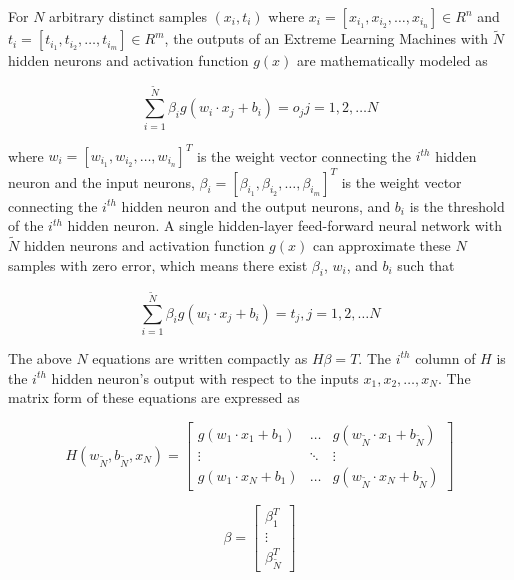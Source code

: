 \documentclass{ncjms}
\begin{document}
	For $N$ arbitrary distinct samples $(x_i, t_i) $ where $x_i = \left[ x_{i_{1}}, x_{i_{2}}, \dots, x_{i_{n}} \right] \in R^n$ and $t_i = \left[ t_{i_{1}}, t_{i_{2}}, \dots, t_{i_{m}} \right] \in R^m$, the outputs of an Extreme Learning Machines with $\tilde{N}$ hidden neurons and activation function $g(x)$ are mathematically modeled as

	\begin{equation}
		\sum_{i=1}^{\tilde{N}} \beta_i g (w_i \cdot x_j + b_i)=o_j         j=1,2, \dots N
	\end{equation}

	where $w_i = \left[ w_{i_{1}}, w_{i_{2}}, \dots, w_{i_{n}} \right]^T$ is the weight vector connecting the $i^{th}$ hidden neuron and the input neurons, $\beta_i=\left[ \beta_{i_{1}}, \beta_{i_{2}}, \dots, \beta_{i_{m}}\right]^T$ is the weight vector connecting the $i^{th}$ hidden neuron and the output neurons, and $b_i$ is the threshold of the $i^{th}$ hidden neuron.
	A single hidden-layer feed-forward neural network with $\tilde{N}$ hidden neurons and activation function $g(x)$ can approximate these $N$ samples with zero error, which means there exist $\beta_i$, $w_i$, and $b_i$ such that

	\begin{equation}
		\sum_{ i = 1}^{\tilde{N}} \beta_i g (w_i \cdot x_j + b_i) = t_j, 	j=1,2, \dots N
	\end{equation}

	The above $N$ equations are written compactly as $H \beta = T$.
	The $i^{th}$ column of $H$ is the $i^{th}$ hidden neuron’s output with respect to the inputs $x_1, x_2, \dots, x_N$.
	The matrix form of these equations are expressed as

	\begin{equation}
		H(w_{\tilde{N}}, b_{\tilde{N}}, x_N)=
		\begin{bmatrix}
			 g(w_1 \cdot x_1 + b_1) & \dots & g(w_{\tilde{N}} \cdot x_1 + b_{\tilde{N}} )\\
			 \vdots & \ddots & \vdots\\
			 g(w_1 \cdot x_N + b_1) & \dots & g(w_{\tilde{N}} \cdot x_N + b_{\tilde{N}} )
		\end{bmatrix}
	\end{equation}

	\begin{equation}
		\beta =
		\begin{bmatrix}
			\beta_{1}^T \\
			\vdots \\
			\beta_{\tilde{N}}^T
		\end{bmatrix}
	\end{equation}
\end{document}

